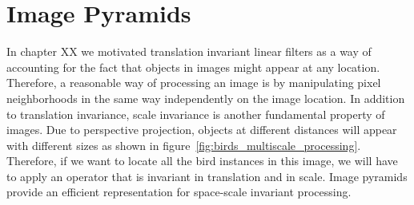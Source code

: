  \chapter{Image Pyramids}\label{chapter:image_pyramids}


%


%



In chapter XX we motivated translation invariant linear filters as a way of accounting for the fact that objects in images might appear at any location. Therefore, a reasonable way of processing an image is by manipulating pixel neighborhoods  in the same way independently on the image location. In addition to translation invariance, scale invariance is another fundamental property of images. Due to perspective projection, objects at different distances will appear with different sizes as shown in figure~\ref{fig:birds_multiscale_processing}. Therefore, if we want to locate all the bird instances in this image, we will have to apply an operator that is invariant in translation and in scale. Image pyramids provide an efficient representation for space-scale invariant processing.

